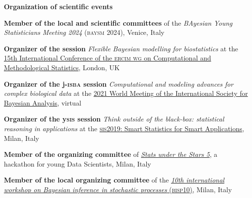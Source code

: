 \documentclass[a4paper,10pt]{article}
\newcommand{\headingfamily}{}
\newlength{\hanggap}\setlength{\hanggap}{0.75em}
\newif\ifcvfresh\cvfreshfalse
\newcommand{\subhead}[1]{%
  \ifcvfresh\cvfreshfalse\else\par\addvspace{0.4\baselineskip}\fi
  {\headingfamily\bfseries\textcolor{accent}{#1}}\nobreak\par
  \addvspace{0.15\baselineskip}\nobreak}
\newcommand{\entry}[1]{{\bfseries #1}}
\newcommand{\yr}[1]{\llap{\textcolor{soft}{\footnotesize\bfseries #1}\hspace{\hanggap}}}
\begin{document}
\subhead{Organization of scientific events}
\begin{dated}
\item[\yr{2024}] \entry{Member of the local and scientific committees} of the \emph{BAyesian Young Statisticians Meeting 2024} (\textsc{baysm 2024}), Venice, Italy
\item[\yr{2022}] \entry{Organizer of the session} \emph{Flexible Bayesian modelling for biostatistics} at the \href{http://www.cmstatistics.org/CMStatistics2022/}{15th International Conference of the \textsc{ercim wg} on Computational and Methodological Statistics}, London, UK
\item[\yr{2021}] \entry{Organizer of the j-\textsc{isba} session} \emph{Computational and modeling advances for complex biological data} at the \href{https://events.stat.uconn.edu/ISBA2021/}{2021 World Meeting of the International Society for Bayesian Analysis}, virtual
\item[\yr{2019}] \entry{Organizer of the y\textsc{sis} session} \emph{Think outside of the black-box: statistical reasoning in applications} at the \href{http://meetings3.sis-statistica.org/index.php/SIS2019/index/schedConfs/current}{\textsc{sis2019}: Smart Statistics for Smart Applications}, Milan, Italy
\item[\yr{2019}] \entry{Member of the organizing committee} of \href{http://www.sus5.unibocconi.eu}{\emph{Stats under the Stars 5}}, a hackathon for young Data Scientists, Milan, Italy
\item[\yr{2017}] \entry{Member of the local organizing committee} of the \href{https://www.unibocconi.eu/wps/wcm/connect/Site/BISP10/Home/}{\emph{10th international workshop on Bayesian inference in stochastic processes} (\textsc{bisp10})}, Milan, Italy
\end{dated}
\end{document}
